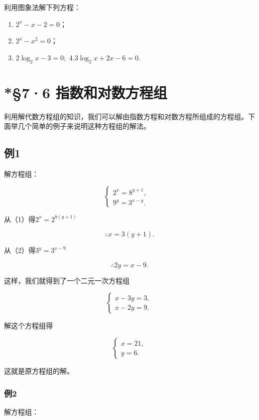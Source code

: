 利用图象法解下列方程：

\begin{enumerate}[start=1]
\item
  \(2^{x} - x - 2 = 0\)；
\item
  \(2^{x} - x^{2} = 0\)；
\item
  \(2\log_2x - 3 = 0;\) 4.\(3\log_{2}x+2x-6=0.\)
\end{enumerate}

\section{*§7·6 指数和对数方程组}

利用解代数方程组的知识，我们可以解由指数方程和对数方程所组成的方程组。下面举几个简单的例子来说明这种方程组的解法。

\subsection{例1}

解方程组：

\[
\left\{ \begin{array}{ll} 2^{x} = 8^{y + 1}, & \\ 9^{y} = 3^{x - y}. & \end{array} \right. \tag {1}
\]

 从（1）得\(2^{x} = 2^{8(y + 1)}\)

\[
\therefore x = 3 (y + 1).
\]

从（2）得\(3^{y} = 3^{x - 9}\)

\[
\therefore 2 y = x - 9.
\]

这样，我们就得到了一个二元一次方程组

\[
\left\{ \begin{array}{l} x - 3 y = 3, \\ x - 2 y = 9. \end{array} \right.
\]

解这个方程组得

\[
\left\{ \begin{array}{l} x = 21, \\ y = 6. \end{array} \right.
\]

这就是原方程组的解。

\subsubsection{例2}

解方程组：

